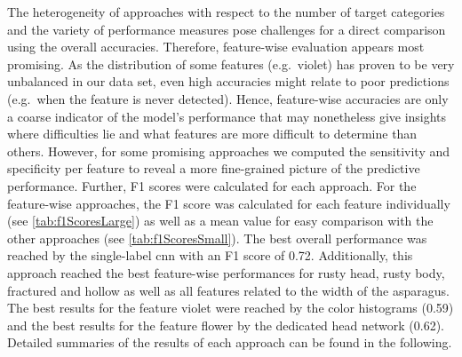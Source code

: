 \begin{table}[!htb]
    \centering
    \caption[Mean F1 Score]{\textbf{Mean F1 Score}~~~The mean F1 score for each approach is displayed. Note that a different set of features was selected for different approaches. Hence, the mean F1 score can only give a first impression regarding differences in the performance. For details see \autoref{tab:f1ScoresLarge}.}
    \label{tab:f1ScoresSmall}
\end{table}

The heterogeneity of approaches with respect to the number of target categories and the variety of performance measures pose challenges for a direct comparison using the overall accuracies. Therefore, feature-wise evaluation appears most promising. As the distribution of some features (e.g.\ violet) has proven to be very unbalanced in our data set, even high accuracies might relate to poor predictions (e.g.\ when the feature is never detected). Hence, feature-wise accuracies are only a coarse indicator of the model’s performance that may nonetheless give insights where difficulties lie and what features are more difficult to determine than others. However, for some promising approaches we computed the sensitivity and specificity per feature to reveal a more fine-grained picture of the predictive performance. Further, F1 scores were calculated for each approach. For the feature-wise approaches, the F1 score was calculated for each feature individually (see \autoref{tab:f1ScoresLarge}) as well as a mean value for easy comparison with the other approaches (see \autoref{tab:f1ScoresSmall}). The best overall performance was reached by the single-label \acrshort{cnn} with an F1 score of 0.72. Additionally, this approach reached the best feature-wise performances for rusty head, rusty body, fractured and hollow as well as all features related to the width of the asparagus. The best results for the feature violet were reached by the color histograms (0.59) and the best results for the feature flower by the dedicated head network (0.62). Detailed summaries of the results of each approach can be found in the following.


